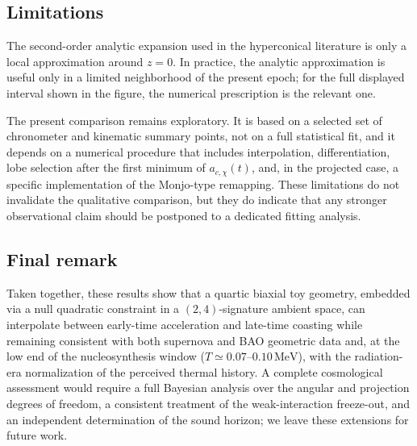 \documentclass[3p,times,twocolumn]{elsarticle}
\begin{document}
\subsection{Limitations}

The second-order analytic expansion used in the hyperconical literature is only a local approximation around $z=0$. In practice, the analytic approximation is useful only in a limited neighborhood of the present epoch; for the full displayed interval shown in the figure, the numerical prescription is the relevant one.

The present comparison remains exploratory. It is based on a selected set of chronometer and kinematic summary points, not on a full statistical fit, and it depends on a numerical procedure that includes interpolation, differentiation, lobe selection after the first minimum of $a_{c,\chi}(t)$, and, in the projected case, a specific implementation of the Monjo-type remapping. These limitations do not invalidate the qualitative comparison, but they do indicate that any stronger observational claim should be postponed to a dedicated fitting analysis.

\subsection{Final remark}

Taken together, these results show that a quartic biaxial toy geometry, embedded via a null quadratic constraint in a $(2,4)$-signature ambient space, can interpolate between early-time acceleration and late-time coasting while remaining consistent with both supernova and BAO geometric data and, at the low end of the nucleosynthesis window ($T\simeq0.07$--$0.10\,\mathrm{MeV}$), with the radiation-era normalization of the perceived thermal history. A complete cosmological assessment would require a full Bayesian analysis over the angular and projection degrees of freedom, a consistent treatment of the weak-interaction freeze-out, and an independent determination of the sound horizon; we leave these extensions for future work.


\end{document}
